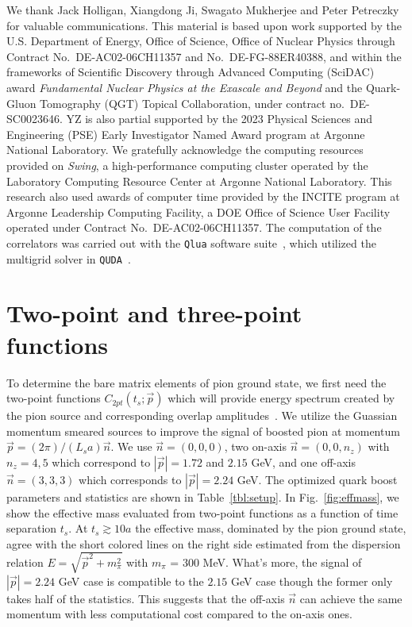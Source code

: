 \documentclass[prd,twocolumn,preprintnumbers,showpacs,nofootinbib,superscriptaddress,notitlepage,floatfix]{revtex4-1}
\DeclareRobustCommand{\fig}[1]{Fig.~\ref{fig:#1}}
\DeclareRobustCommand{\tbl}[1]{Table~\ref{tbl:#1}}
\begin{document}
\begin{acknowledgments}

We thank Jack Holligan, Xiangdong Ji, Swagato Mukherjee and Peter Petreczky for valuable communications.
This material is based upon work supported by the U.S. Department of Energy, Office of Science, Office of Nuclear Physics through Contract No.~DE-AC02-06CH11357 and No.~DE-FG-88ER40388, and within the frameworks of Scientific Discovery through Advanced Computing (SciDAC) award \textit{Fundamental Nuclear Physics at the Exascale and Beyond} and the Quark-Gluon Tomography (QGT) Topical Collaboration, under contract no.~DE-SC0023646. 
YZ is also partial supported by the 2023 Physical Sciences and Engineering (PSE) Early Investigator Named Award program at Argonne National Laboratory.
We gratefully acknowledge the computing resources provided on \textit{Swing}, a high-performance computing cluster operated by the Laboratory Computing Resource Center at Argonne National Laboratory.
This research also used awards of computer time provided by the INCITE program at Argonne Leadership Computing Facility, a DOE Office of Science User Facility operated under Contract No.~DE-AC02-06CH11357. 
The computation of the correlators was carried out with the \texttt{Qlua} software suite~\cite{qlua}, which utilized the multigrid solver in \texttt{QUDA}~\cite{Clark:2009wm,Babich:2011np}.

\end{acknowledgments}


\appendix

\section{Two-point and three-point functions}\label{app:bare}

To determine the bare matrix elements of pion ground state, we first need the two-point functions $C_{2pt}(t_s;\vec{p})$ which will provide energy spectrum created by the pion source and corresponding overlap amplitudes~\cite{Izubuchi:2019lyk}. We utilize the Guassian momentum smeared sources to improve the signal of boosted pion at momentum $\vec{p}=(2\pi)/(L_sa)\vec{n}$. We use $\vec{n}=(0,0,0)$, two on-axis $\vec{n}=(0,0,n_z)$ with $n_z=4,5$ which correspond to $|\vec{p}|=1.72$ and $2.15$ GeV, and one off-axis $\vec{n}=(3,3,3)$ which corresponds to $|\vec{p}|=2.24$ GeV. The optimized quark boost parameters and statistics are shown in \tbl{setup}. In \fig{effmass}, we show the effective mass evaluated from two-point functions as a function of time separation $t_s$. At $t_s\gtrsim 10a$ the effective mass, dominated by the pion ground state, agree with the short colored lines on the right side estimated from the dispersion relation $E=\sqrt{\vec{p}^2+m_\pi^2}$ with $m_\pi$ = 300 MeV. What's more, the signal of $|\vec{p}|=2.24$ GeV case is compatible to the $2.15$ GeV case though the former only takes half of the statistics. This suggests that the off-axis $\vec{n}$ can achieve the same momentum with less computational cost compared to the on-axis ones.
\end{document}
